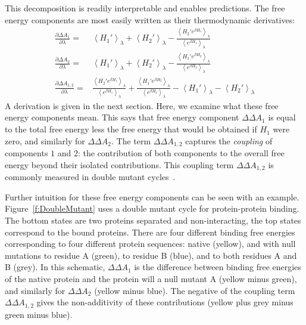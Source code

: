 \documentclass{article}
\begin{document}
This decomposition is readily interpretable and enables predictions. The free energy components are most easily written as their thermodynamic derivatives: 
\begin{align}
\frac{\partial \Delta  A_1}{\partial \lambda} =&
	\left\langle
		H_1'
	\right\rangle_\lambda +
	\left\langle
		H_2'
	\right\rangle_\lambda -
	\frac
		{\left\langle H_2' e^{\beta H_1} \right\rangle_\lambda}
		{\left\langle e^{\beta H_1} \right\rangle_\lambda} \nonumber  \\
\frac{\partial \Delta A_2}{\partial \lambda} =&
	\left\langle
		H_1'
	\right\rangle_\lambda +
	\left\langle
		H_2'
	\right\rangle_\lambda -
	\frac
		{\left\langle H_1' e^{\beta H_2} \right\rangle_\lambda}
		{\left\langle e^{\beta H_2} \right\rangle_\lambda} \nonumber \\
\frac{\partial \Delta A_{1,2}}{\partial \lambda} =&
	\frac
		{\left\langle H_2' e^{\beta H_1} \right\rangle_\lambda}
		{\left\langle e^{\beta H_1} \right\rangle_\lambda} +
	\frac
		{\left\langle H_1' e^{\beta H_2} \right\rangle_\lambda}
		{\left\langle e^{\beta H_2} \right\rangle_\lambda} -
	\left\langle
		H_1'
	\right\rangle_\lambda -
	\left\langle
		H_2'
	\right\rangle_\lambda
	\label{eq:GoodComponents}
\end{align}
A derivation is given in the next section. Here, we examine what these free energy components mean. This says that free energy component $\Delta \Delta A_1$ is equal to the total free energy less the free energy that would be obtained if $H_1$ were zero, and similarly for $\Delta \Delta A_2$. The term  $\Delta \Delta A_{1,2}$ captures the \textit{coupling} of components $1$ and $2$: the contribution of both components to the overall free energy beyond their isolated contributions. This coupling term $\Delta \Delta A_{1,2}$ is commonly measured in double mutant cycles~\cite{Cho:2014fl}.

Further intuition for these free energy components can be seen with an example. Figure~\ref{f:DoubleMutant} uses a double mutant cycle for protein-protein binding. The bottom states are two proteins separated and non-interacting, the top states correspond to the bound proteins. There are four different binding free energies corresponding to four different protein sequences: native (yellow), and with null mutations to residue A (green), to residue B (blue), and to both residues A and B (grey). In this schematic, $\Delta \Delta A_1$ is the difference between binding free energies of the native protein and the protein will a null mutant A (yellow minus green), and similarly for $\Delta \Delta A_2$ (yellow minus blue). The negative of the coupling term $\Delta \Delta A_{1,2}$ gives the non-additivity of these contributions (yellow plus grey minus green minus blue). 
\end{document}
